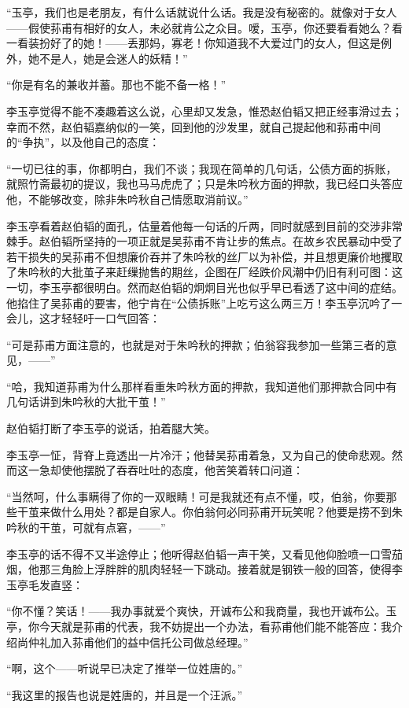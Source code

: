 \par “玉亭，我们也是老朋友，有什么话就说什么话。我是没有秘密的。就像对于女人——假使荪甫有相好的女人，未必就肯公之众目。嗳，玉亭，你还要看看她么？看一看装扮好了的她！——丢那妈，寡老！你知道我不大爱过门的女人，但这是例外，她不是人，她是会迷人的妖精！”
\par “你是有名的兼收并蓄。那也不能不备一格！”
\par 李玉亭觉得不能不凑趣着这么说，心里却又发急，惟恐赵伯韬又把正经事滑过去；幸而不然，赵伯韬嘉纳似的一笑，回到他的沙发里，就自己提起他和荪甫中间的“争执”，以及他自己的态度：
\par “一切已往的事，你都明白，我们不谈；我现在简单的几句话，公债方面的拆账，就照竹斋最初的提议，我也马马虎虎了；只是朱吟秋方面的押款，我已经口头答应他，不能够改变，除非朱吟秋自己情愿取消前议。”
\par 李玉亭看着赵伯韬的面孔，估量着他每一句话的斤两，同时就感到目前的交涉非常棘手。赵伯韬所坚持的一项正就是吴荪甫不肯让步的焦点。在故乡农民暴动中受了若干损失的吴荪甫不但想廉价吞并了朱吟秋的丝厂以为补偿，并且想更廉价地攫取了朱吟秋的大批茧子来赶缫抛售的期丝，企图在厂经跌价风潮中仍旧有利可图：这一切，李玉亭都很明白。然而赵伯韬的炯炯目光也似乎早已看透了这中间的症结。他掐住了吴荪甫的要害，他宁肯在“公债拆账”上吃亏这么两三万！李玉亭沉吟了一会儿，这才轻轻吁一口气回答：
\par “可是荪甫方面注意的，也就是对于朱吟秋的押款；伯翁容我参加一些第三者的意见，——”
\par “哈，我知道荪甫为什么那样看重朱吟秋方面的押款，我知道他们那押款合同中有几句话讲到朱吟秋的大批干茧！”
\par 赵伯韬打断了李玉亭的说话，拍着腿大笑。
\par 李玉亭一怔，背脊上竟透出一片冷汗；他替吴荪甫着急，又为自己的使命悲观。然而这一急却使他摆脱了吞吞吐吐的态度，他苦笑着转口问道：
\par “当然呵，什么事瞒得了你的一双眼睛！可是我就还有点不懂，哎，伯翁，你要那些干茧来做什么用处？都是自家人。你伯翁何必同荪甫开玩笑呢？他要是捞不到朱吟秋的干茧，可就有点窘，——”
\par 李玉亭的话不得不又半途停止；他听得赵伯韬一声干笑，又看见他仰脸喷一口雪茄烟，他那三角脸上浮胖胖的肌肉轻轻一下跳动。接着就是钢铁一般的回答，使得李玉亭毛发直竖：
\par “你不懂？笑话！——我办事就爱个爽快，开诚布公和我商量，我也开诚布公。玉亭，你今天就是荪甫的代表，我不妨提出一个办法，看荪甫他们能不能答应：我介绍尚仲礼加入荪甫他们的益中信托公司做总经理。”
\par “啊，这个——听说早已决定了推举一位姓唐的。”
\par “我这里的报告也说是姓唐的，并且是一个汪派。”

